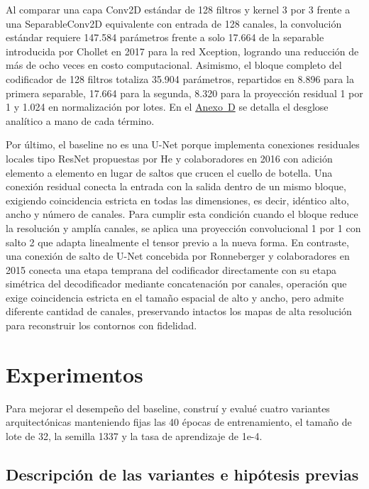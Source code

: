\documentclass[10pt,letterpaper]{article}
\newcommand{\sangria}{\hspace*{1.5em}}
\newcommand{\refanexo}[2]{\hyperref[#1]{Anexo~#2}}
\begin{document}
Al comparar una capa Conv2D estándar de 128 filtros y kernel 3 por 3 frente a una SeparableConv2D equivalente con entrada de 128 canales, la convolución estándar requiere 147.584 parámetros frente a solo 17.664 de la separable introducida por Chollet en 2017 para la red Xception, logrando una reducción de más de ocho veces en costo computacional. Asimismo, el bloque completo del codificador de 128 filtros totaliza 35.904 parámetros, repartidos en 8.896 para la primera separable, 17.664 para la segunda, 8.320 para la proyección residual 1 por 1 y 1.024 en normalización por lotes. En el \refanexo{anexo_d}{D} se detalla el desglose analítico a mano de cada término.

Por último, el baseline no es una U-Net porque implementa conexiones residuales locales tipo ResNet propuestas por He y colaboradores en 2016 con adición elemento a elemento en lugar de saltos que crucen el cuello de botella. Una conexión residual conecta la entrada con la salida dentro de un mismo bloque, exigiendo coincidencia estricta en todas las dimensiones, es decir, idéntico alto, ancho y número de canales. Para cumplir esta condición cuando el bloque reduce la resolución y amplía canales, se aplica una proyección convolucional 1 por 1 con salto 2 que adapta linealmente el tensor previo a la nueva forma. En contraste, una conexión de salto de U-Net concebida por Ronneberger y colaboradores en 2015 conecta una etapa temprana del codificador directamente con su etapa simétrica del decodificador mediante concatenación por canales, operación que exige coincidencia estricta en el tamaño espacial de alto y ancho, pero admite diferente cantidad de canales, preservando intactos los mapas de alta resolución para reconstruir los contornos con fidelidad.

\section{Experimentos}

\sangria Para mejorar el desempeño del baseline, construí y evalué cuatro variantes arquitectónicas manteniendo fijas las 40 épocas de entrenamiento, el tamaño de lote de 32, la semilla 1337 y la tasa de aprendizaje de 1e-4.

\subsection{Descripción de las variantes e hipótesis previas}
\end{document}
